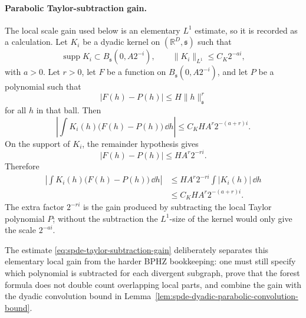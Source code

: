 \paragraph{Parabolic Taylor-subtraction gain.}
The local scale gain used below is an elementary \(L^1\) estimate, so it is
recorded as a calculation.  Let \(K_i\) be a dyadic kernel on
\((\mathbb R^D,\mathfrak s)\) such that
\[
  \operatorname{supp}K_i\subset B_{\mathfrak s}(0,A2^{-i}),
  \qquad
  \|K_i\|_{L^1}\leq C_K2^{-ai},
\]
with \(a>0\).  Let \(r>0\), let \(F\) be a function on
\(B_{\mathfrak s}(0,A2^{-i})\), and let \(P\) be a polynomial such that
\begin{equation}
  |F(h)-P(h)|
  \leq
  H\|h\|_{\mathfrak s}^{r}
  \label{eq:spde-parabolic-taylor-remainder-hypothesis}
\end{equation}
for all \(h\) in that ball.  Then
\begin{equation}
  \left|
    \int K_i(h)\bigl(F(h)-P(h)\bigr)\,\dd h
  \right|
  \leq
  C_KH A^r2^{-(a+r)i}.
  \label{eq:spde-taylor-subtraction-gain}
\end{equation}
On the support of \(K_i\), the remainder hypothesis gives
\[
  |F(h)-P(h)|\leq H A^r2^{-ri}.
\]
Therefore
\[
\begin{aligned}
  \left|
    \int K_i(h)\bigl(F(h)-P(h)\bigr)\,\dd h
  \right|
  &\leq
  H A^r2^{-ri}\int |K_i(h)|\,\dd h        \\
  &\leq
  C_KH A^r2^{-(a+r)i}.
\end{aligned}
\]
The extra factor \(2^{-ri}\) is the gain produced by subtracting the local
Taylor polynomial \(P\); without the subtraction the \(L^1\)-size of the
kernel would only give the scale \(2^{-ai}\).

The estimate \eqref{eq:spde-taylor-subtraction-gain} deliberately separates
this elementary local gain from the harder BPHZ bookkeeping: one must still
specify which polynomial is subtracted for each divergent subgraph, prove
that the forest formula does not double count overlapping local parts, and
combine the gain with the dyadic convolution bound in
Lemma~\ref{lem:spde-dyadic-parabolic-convolution-bound}.


